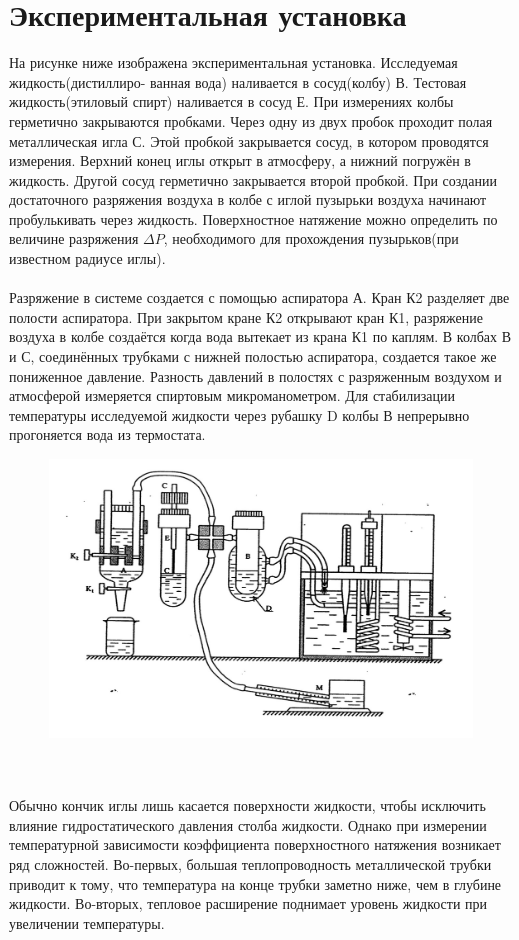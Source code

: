 \documentclass[a4paper, 12pt]{article}
\begin{document}
	\section*{Экспериментальная установка}
		На рисунке ниже изображена экспериментальная установка. Исследуемая жидкость(дистиллиро- ванная вода) наливается в сосуд(колбу) В. Тестовая жидкость(этиловый спирт) наливается в сосуд Е. При измерениях колбы герметично закрываются пробками. Через одну из двух пробок проходит полая металлическая игла С. Этой пробкой закрывается сосуд, в котором проводятся измерения. Верхний конец иглы открыт в атмосферу, а нижний погружён в жидкость. Другой сосуд герметично закрывается второй пробкой. При создании достаточного разряжения воздуха в колбе с иглой пузырьки воздуха начинают пробулькивать через жидкость. Поверхностное натяжение можно определить по величине разряжения $\Delta P$, необходимого для прохождения пузырьков(при известном радиусе иглы).
		\\
		\\
		Разряжение в системе создается с помощью аспиратора А. Кран К2 разделяет две полости аспиратора. При закрытом кране К2 открывают кран К1, разряжение воздуха в колбе создаётся когда вода вытекает из крана К1 по каплям. В колбах В и С, соединённых трубками с нижней полостью аспиратора, создается такое же пониженное давление. Разность давлений в полостях с разряженным воздухом и атмосферой измеряется спиртовым микроманометром. Для стабилизации температуры исследуемой жидкости через рубашку D колбы В непрерывно прогоняется вода из термостата. 
\begin{figure}[h]
\centering
\includegraphics[width=0.7\linewidth]{Scheme}
\label{fig:scheme}			
\end{figure}
		\\
		\\
		Обычно кончик иглы лишь касается поверхности жидкости, чтобы исключить влияние гидростатического давления столба жидкости. Однако при измерении температурной зависимости коэффициента поверхностного натяжения возникает ряд сложностей. Во-первых, большая теплопроводность металлической трубки приводит к тому, что температура на конце трубки заметно ниже, чем в глубине жидкости. Во-вторых, тепловое расширение поднимает уровень жидкости при увеличении температуры.
\end{document}
